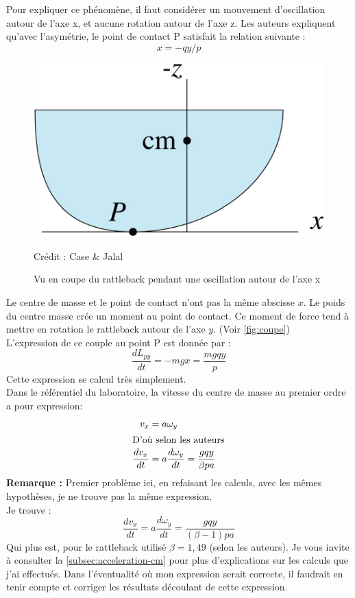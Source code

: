 \documentclass[12pt,a4paper]{article}
\begin{document}
	Pour expliquer ce phénomène, il faut considérer un mouvement d'oscillation autour de l'axe x, et aucune rotation autour de l'axe z.
	Les auteurs expliquent qu'avec l'asymétrie, le point de contact P satisfait la relation suivante :
	\begin{equation}
		\label{eq:asymetrie}
		x=-qy/p
	\end{equation}
	
	\begin{figure}
		\centering
		\includegraphics[width=0.7\linewidth]{res/coupe}
		\caption{Vu en coupe du rattleback pendant une oscillation autour de l'axe x}{Crédit : Case \& Jalal}
		\label{fig:coupe}
	\end{figure}
	Le centre de masse et le point de contact n'ont pas la même abscisse $x$. Le poids du centre masse crée un moment au point de contact. Ce moment de force tend à mettre en rotation le rattleback autour de l'axe $y$. (Voir \autoref{fig:coupe})\\
	L'expression de ce couple au point P est donnée par :
	\begin{equation}
	\dfrac{dL_{py}}{dt}=-mgx=\dfrac{mgqy}{p}
	\end{equation}
	Cette expression se calcul très simplement.\\
	
	Dans le référentiel du laboratoire, la vitesse du centre de masse au premier ordre a pour expression:
	\begin{align}
	v_x&=a \omega_y\\
	\intertext{D'où selon les auteurs}
	\label{eq:acc-cm}
	\dfrac{dv_x}{dt}&=a\dfrac{d\omega_y}{dt}=\dfrac{gqy}{\beta p a}
	\end{align}
	\textbf{Remarque : } Premier problème ici, en refaisant les calculs, avec les mêmes hypothèses, je ne trouve pas la même expression.\\
	Je trouve : 
	$$\dfrac{dv_x}{dt}=a\dfrac{d\omega_y}{dt}=\dfrac{gqy}{(\beta-1) p a}$$
	Qui plus est, pour le rattleback utilisé $\beta=1,49$ (selon les auteurs). Je vous invite à consulter la \autoref{subsec:acceleration-cm} pour plus d'explications sur les calculs que j'ai effectués. Dans l'éventualité où mon expression serait correcte, il faudrait en tenir compte et corriger les résultats découlant de cette expression.
	
\end{document}
